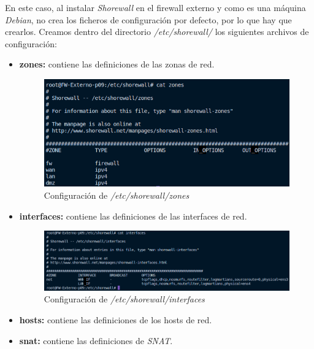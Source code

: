 \documentclass[11pt]{report}
\begin{document}
En este caso, al instalar \emph{Shorewall} en el firewall externo y como es una máquina \emph{Debian}, no crea los ficheros
de configuración por defecto, por lo que hay que crearlos. Creamos dentro del directorio \emph{/etc/shorewall/} los siguientes
archivos de configuración:
\begin{itemize}
  \item \textbf{zones:} contiene las definiciones de las zonas de red.
  \begin{figure}[H]
    \centering
    \includegraphics[scale=0.65]{img/zones.png}
    \caption{Configuración de \emph{/etc/shorewall/zones}}
    \label{fig:Configuracion de /etc/shorewall/zones}
  \end{figure}
  \item \textbf{interfaces:} contiene las definiciones de las interfaces de red.
  \begin{figure}[H]
    \centering
    \includegraphics[scale=0.65]{img/interfaces.png}
    \caption{Configuración de \emph{/etc/shorewall/interfaces}}
    \label{fig:Configuracion de /etc/shorewall/interfaces}
  \end{figure}
  \item \textbf{hosts:} contiene las definiciones de los hosts de red.
  \item \textbf{snat:} contiene las definiciones de \emph{SNAT}. 
\end{itemize}



\end{document}
